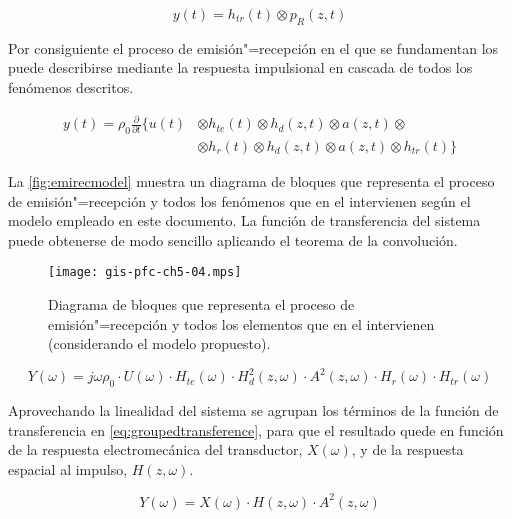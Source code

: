 \begin{equation}
	y(t) = h_{tr}(t)\otimes p_R(z, t)
	\label{eq:receiver}
\end{equation}

Por consiguiente el proceso de emisión"=recepción en el que se fundamentan los  puede describirse mediante la respuesta impulsional en cascada de todos los fenómenos descritos.

\begin{equation}\label{eq:emirec}
	\begin{split}
		y(t) = \rho_0\frac{\partial}{\partial t}\{u(t)&\otimes h_{te}(t)\otimes h_d(z, t)\otimes a(z, t)\otimes \\
		&\otimes h_r(t)\otimes h_d(z, t)\otimes a(z, t)\otimes h_{tr}(t)\}
	\end{split}
\end{equation}

La \vref{fig:emirecmodel} muestra un diagrama de bloques que representa el proceso de emisión"=recepción y todos los fenómenos que en el intervienen según el modelo empleado en este documento. La función de transferencia del sistema puede obtenerse de modo sencillo aplicando el teorema de la convolución.

\begin{figure}
	\begin{center}
		\texttt{[image: gis-pfc-ch5-04.mps]}
	\end{center}
	\caption[Proceso de emisión"=recepción y elementos que en él intervienen]{Diagrama de bloques que representa el proceso de emisión"=recepción y todos los elementos que en el intervienen (considerando el modelo propuesto).}
	\label{fig:emirecmodel}
\end{figure}

\begin{equation}
	Y(\omega) = j\omega\rho_0\cdot U(\omega)\cdot H_{te}(\omega)\cdot H^2_d(z, \omega)\cdot A^2(z, \omega)\cdot H_r(\omega)\cdot H_{tr}(\omega)
	\label{eq:transference}
\end{equation}

Aprovechando la linealidad del sistema se agrupan los términos de la función de transferencia en \eqref{eq:groupedtransference}, para que el resultado quede en función de la respuesta electromecánica del transductor, $X(\omega)$, y de la respuesta espacial al impulso, $H(z, \omega)$.

\begin{equation}
	Y(\omega) = X(\omega)\cdot H(z, \omega)\cdot A^2(z, \omega)
	\label{eq:groupedtransference}
\end{equation}

